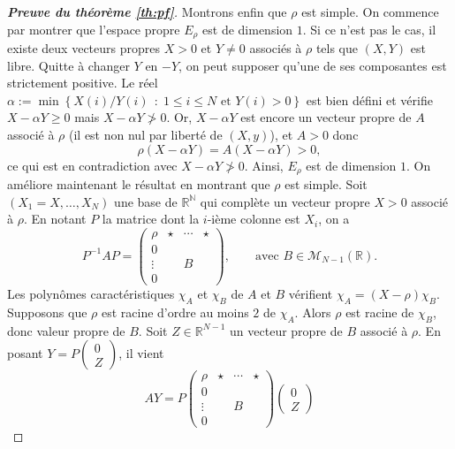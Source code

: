 \documentclass[11pt]{article}
\newcommand{\ens}[3][\middle|]{
    \left\{#2 \;\, #1 \; #3\right\}
}
\newcommand{\R}{\mathbb{R}}
\newcommand{\N}{\mathbb{N}}
\renewcommand{\leq}{\leqslant}
\renewcommand{\geq}{\geqslant}
\theoremstyle{plain}
\begin{document}
\begin{proof}[\emph{\textbf{Preuve du théorème \ref{th:pf}}}]
    Montrons enfin que $\rho$ est simple. On commence par montrer que l'espace propre $E_{\rho}$ est de dimension $1$. Si ce n'est pas le cas, il existe deux vecteurs propres $X > 0$ et $Y \neq 0$ associés à $\rho$ tels que $(X,Y)$ est libre. Quitte à changer $Y$ en $-Y$, on peut supposer qu'une de ses composantes est strictement positive. Le réel $\alpha := \min\ens[:]{X(i)/Y(i)}{1 \leq i \leq N \text{ et } Y(i) > 0}$ est bien défini et vérifie $X - \alpha Y \geq 0$ mais $X - \alpha Y \ngtr 0$. Or, $X - \alpha Y$ est encore un vecteur propre de $A$ associé à $\rho$ (il est non nul par liberté de $(X, y)$), et $A > 0$ donc
    $$\rho (X - \alpha Y) = A(X - \alpha Y) > 0,$$
    ce qui est en contradiction avec $X - \alpha Y \ngtr 0$. Ainsi, $E_{\rho}$ est de dimension $1$. On améliore maintenant le résultat en montrant que $\rho$ est simple. Soit $(X_1 = X, \ldots, X_N)$ une base de $\R^{\N}$ qui complète un vecteur propre $X > 0$ associé à $\rho$. En notant $P$ la matrice dont la $i$-ième colonne est $X_i$, on a 
    $$P^{-1}AP = 
    \left(
    \begin{array}{c|ccc}
        \rho   & \star & \cdots & \star\\
         \hline
        0      &       &        &\\
        \vdots &       & B      &\\
        0      &       &        &
    \end{array}
    \right), \qquad \text{avec } B \in \mathcal{M}_{N - 1}(\R).$$
    Les polynômes caractéristiques $\chi_A$ et $\chi_B$ de $A$ et $B$ vérifient $\chi_A = (X - \rho) \chi_B$. Supposons que $\rho$ est racine d'ordre au moins $2$ de $\chi_A$. Alors $\rho$ est racine de $\chi_B$, donc valeur propre de $B$. Soit $Z \in \R^{N-1}$ un vecteur propre de $B$ associé à $\rho$. En posant $Y = P\begin{pmatrix} 0\\ Z \end{pmatrix}$, il vient
    $$AY = P 
    \left(
    \begin{array}{c|ccc}
        \rho   & \star & \cdots & \star\\
            \hline
        0      &       &        &\\
        \vdots &       & B      &\\
        0      &       &        &
    \end{array}
    \right)
    \begin{pmatrix} 0\\ Z \end{pmatrix}
$$
\end{proof}
\end{document}
